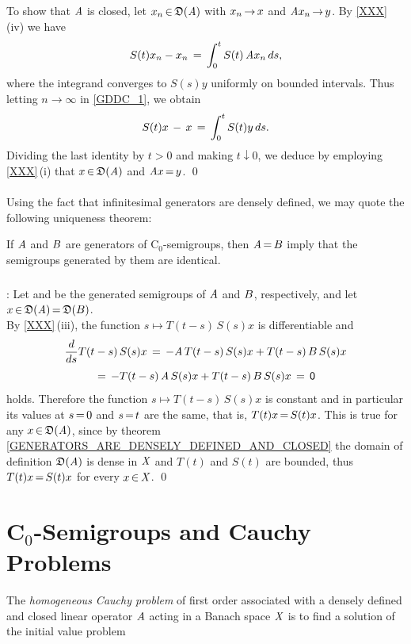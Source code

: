 \documentclass[11pt,twoside]{article}
\begin{document}
\subparagraph{}
To show that $\linA$ is closed,
let $x_n \xeof \domain{\linA}$ with $x_n \xto x$ and $\linA x_n \xto y$.
By \ref{XXX}\,(iv) we have
\begin{equation}\label{GDDC_1}
S(t)x_n -x_n \= \int_0^t S(t)\,\linA x_n \, ds,
\end{equation}
where the integrand converges to $S(s)y$ uniformly on bounded intervals.
Thus letting $n \to \infty$ in \eqref{GDDC_1}, we obtain
\[
S(t)x \,-\, x \= \int_0^t S(t)y \, ds.
\]
Dividing the last identity by $t>0$ and making $t \downarrow 0$,
we deduce by employing \ref{XXX}\,(i) that $x \xeof \domain{\linA}$
and $\linA x \eq y$.
\qed

\paragraph{} %
Using the fact that infinitesimal generators are densely defined,
we may quote the following uniqueness theorem:

\begin{theorem}
If $\linA$ and $\linB$ are generators of C$_0$-semigroups,
then $\linA \eq \linB$ imply that the semigroups generated by them
are identical.
\end{theorem}

\subparagraph{}
\Proof:
Let {\TG} and {\SG} be the generated semigroups of $\linA$ and $\linB$,
respectively,
and let $x \xeof \domain{\linA} \eq \domain{\linB}$.\\
By \ref{XXX}\,(iii),
the function $s \mapsto T(t-s)\,S(s)x$ is differentiable and
\[
\frac{d}{ds} T(t-s)\, S(s)x \= -\linA\, T(t-s)\,S(s)x + T(t-s)\,\linB\, S(s)x
\]
\[
\= -T(t-s)\,\linA \,S(s)x + T(t-s)\,\linB\,S(s)x \= \0
\]
holds.
Therefore the function $s \mapsto T(t-s)\,S(s)x$ 
is constant and in particular its values at $s \eq 0$
and $s \eq t$ are the same,
that is,
$T(t)x \eq S(t)x$.
This is true for any $x \xeof \domain{\linA}$,
since by theorem \ref{GENERATORS_ARE_DENSELY_DEFINED_AND_CLOSED}
the domain of definition $\domain{\linA}$ is dense in $\banX$
and $T(t)$ and $S(t)$ are bounded,
thus $T(t)x \eq S(t)x$ for every $x \xeof \banX$.
\qed

\section{C$_0$-Semigroups and Cauchy Problems}
The \textit{homogeneous Cauchy problem} of first order associated with
a densely defined and closed linear operator $\linA$ acting in a Banach space
$\banX$ is to find a solution of the initial value problem 
\end{document}
